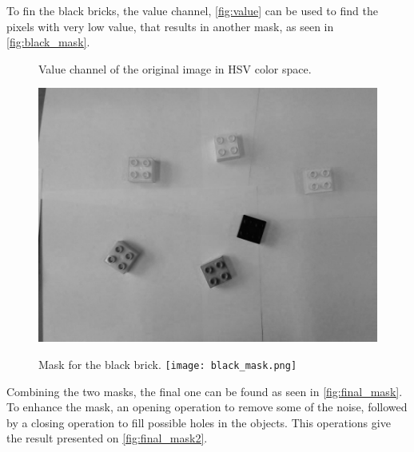 To fin the black bricks, the value channel, \autoref{fig:value} can be used to find the pixels with very low value, that results in another mask, as seen in \autoref{fig:black_mask}.

\begin{figure}[H]
    \captionbox  %
    {
        Value channel of the original image in HSV color space.                
        \label{fig:value}                                  
    }                                                                 
    {       
                                                                    
        \includegraphics[width=.4\textwidth]{figures/value.png}         
    }                                                                    
    \hspace{5pt}                                                          
    \captionbox
    {  
        Mask for the black brick.
        \label{fig:black_mask}                                     
    }
    {
        \texttt{[image: black\_mask.png]}            
    }                                                                             
\end{figure}

Combining the two masks, the final one can be found as seen in \autoref{fig:final_mask}. To enhance the mask, an opening operation to remove some of the noise, followed by a closing operation to fill possible holes in the objects. This operations give the result presented on \autoref{fig:final_mask2}.


